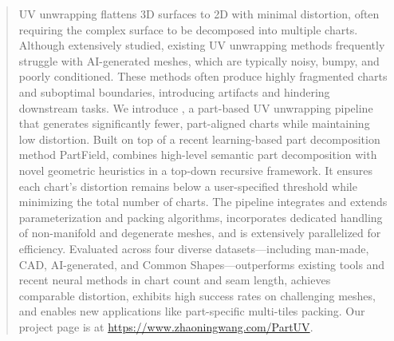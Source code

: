 \begin{abstract}
UV unwrapping flattens 3D surfaces to 2D with minimal distortion, often requiring the complex surface to be decomposed into multiple charts. Although extensively studied, existing UV unwrapping methods frequently struggle with AI-generated meshes, which are typically noisy, bumpy, and poorly conditioned. These methods often produce highly fragmented charts and suboptimal boundaries, introducing artifacts and hindering downstream tasks. We introduce \ourmodel, a part-based UV unwrapping pipeline that generates significantly fewer, part-aligned charts while maintaining low distortion. Built on top of a recent learning-based part decomposition method PartField, \ourmodel combines high-level semantic part decomposition with novel geometric heuristics in a top-down recursive framework. It ensures each chart’s distortion remains below a user-specified threshold while minimizing the total number of charts. The pipeline integrates and extends parameterization and packing algorithms, incorporates dedicated handling of non-manifold and degenerate meshes, and is extensively parallelized for efficiency. Evaluated across four diverse datasets—including man-made, CAD, AI-generated, and Common Shapes—\ourmodel outperforms existing tools and recent neural methods in chart count and seam length, achieves comparable distortion, exhibits high success rates on challenging meshes, and enables new applications like part-specific multi-tiles packing. Our project page is at \url{https://www.zhaoningwang.com/PartUV}.

\end{abstract}